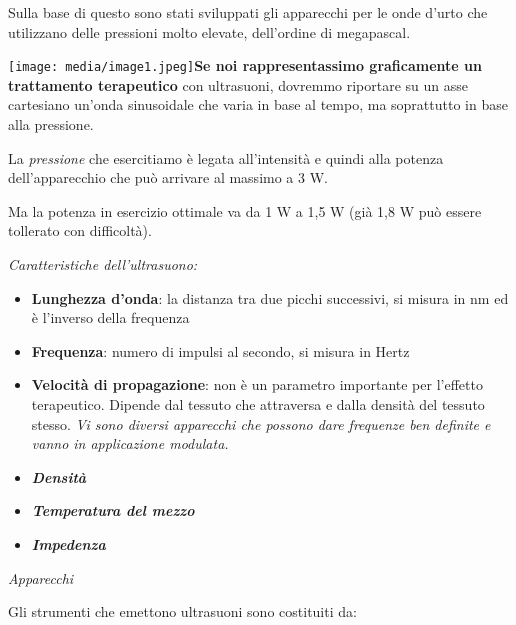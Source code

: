 \documentclass[]{article}
\begin{document}
Sulla base di questo sono stati sviluppati gli apparecchi per le onde
d'urto che utilizzano delle pressioni molto elevate, dell'ordine di
megapascal.

\texttt{[image: media/image1.jpeg]}\textbf{Se
noi rappresentassimo graficamente un trattamento terapeutico} con
ultrasuoni, dovremmo riportare su un asse cartesiano un'onda sinusoidale
che varia in base al tempo, ma soprattutto in base alla pressione.

La \emph{pressione} che esercitiamo è legata all'intensità e quindi alla
potenza dell'apparecchio che può arrivare al massimo a 3 W.

Ma la potenza in esercizio ottimale va da 1 W a 1,5 W (già 1,8 W può
essere tollerato con difficoltà).

\emph{Caratteristiche dell'ultrasuono:}

\begin{itemize}
\item
  \textbf{Lunghezza d'onda}: la distanza tra due picchi successivi, si
  misura in nm ed è l'inverso della frequenza
\item
  \textbf{Frequenza}: numero di impulsi al secondo, si misura in Hertz
\item
  \textbf{Velocità di propagazione}: non è un parametro importante per
  l'effetto terapeutico. Dipende dal tessuto che attraversa e dalla
  densità del tessuto stesso. \emph{Vi sono diversi apparecchi che
  possono dare frequenze ben definite e vanno in applicazione modulata.}
\item
  \emph{\textbf{Densità}}
\item
  \emph{\textbf{Temperatura del mezzo}}
\item
  \emph{\textbf{Impedenza}}
\end{itemize}

\emph{Apparecchi }

Gli strumenti che emettono ultrasuoni sono costituiti da:
\end{document}
